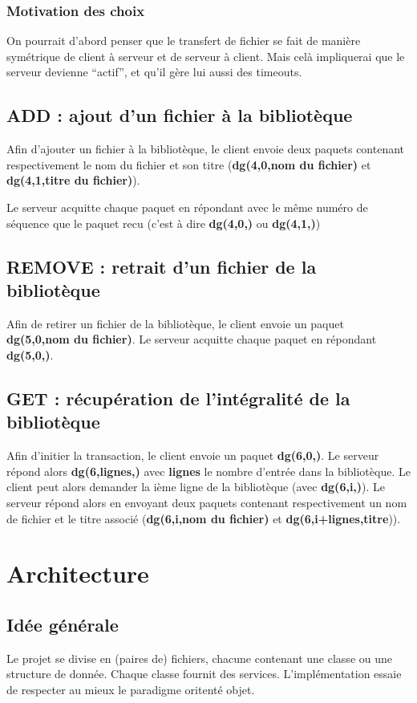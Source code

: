 \documentclass[10pt,a4paper]{article}
\begin{document}
\subsubsection{Motivation des choix}
On pourrait d'abord penser que le transfert de fichier se fait de manière symétrique de client à serveur et de serveur à client. Mais celà impliquerai que le serveur devienne ``actif'', et qu'il gère lui aussi des timeouts.

\subsection{ADD : ajout d'un fichier à la bibliotèque}
Afin d'ajouter un fichier à la bibliotèque, le client envoie deux paquets contenant respectivement le nom du fichier et son titre (\textbf{dg(4,0,nom du fichier)} et \textbf{dg(4,1,titre du fichier)}).

Le serveur acquitte chaque paquet en répondant avec le même numéro de séquence que le paquet recu (c'est à dire \textbf{dg(4,0,)} ou \textbf{dg(4,1,)})

\subsection{REMOVE : retrait d'un fichier de la bibliotèque}
Afin de retirer un fichier de la bibliotèque, le client envoie un paquet \textbf{dg(5,0,nom du fichier)}.
Le serveur acquitte chaque paquet en répondant \textbf{dg(5,0,)}.

\subsection{GET : récupération de l'intégralité de la bibliotèque}
Afin d'initier la transaction, le client envoie un paquet \textbf{dg(6,0,)}.
Le serveur répond alors \textbf{dg(6,lignes,)} avec \textbf{lignes} le nombre d'entrée dans la bibliotèque.
Le client peut alors demander la ième ligne de la bibliotèque (avec \textbf{dg(6,i,)}). Le serveur répond alors en envoyant deux paquets contenant respectivement un nom de fichier et le titre associé (\textbf{dg(6,i,nom du fichier)} et \textbf{dg(6,i+lignes,titre})).

\newpage

\section{Architecture}
\subsection{Idée générale}
Le projet se divise en (paires de) fichiers, chacune contenant une classe ou une structure de donnée. Chaque classe fournit des services. L'implémentation essaie de respecter au mieux le paradigme oritenté objet.
\end{document}
